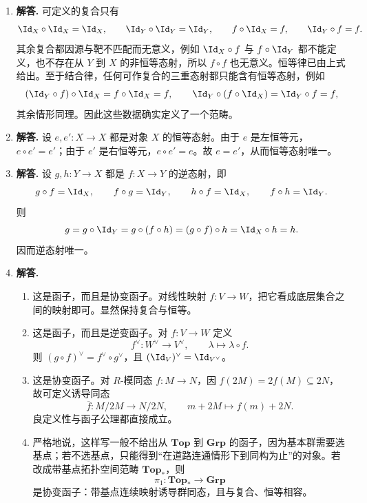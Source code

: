 \begin{enumerate}[label=\textbf{A.\arabic*.}, leftmargin=*, itemsep=1em]
  \item \textbf{解答.} 可定义的复合只有
  \[
    \Id_X\circ \Id_X=\Id_X,
    \qquad
    \Id_Y\circ \Id_Y=\Id_Y,
    \qquad
    f\circ \Id_X=f,
    \qquad
    \Id_Y\circ f=f.
  \]
  其余复合都因源与靶不匹配而无意义，例如 $\Id_X\circ f$ 与 $f\circ \Id_Y$ 都不能定义，也不存在从 $Y$ 到 $X$ 的非恒等态射，所以 $f\circ f$ 也无意义。恒等律已由上式给出。至于结合律，任何可作复合的三重态射都只能含有恒等态射，例如
  \[
    (\Id_Y\circ f)\circ \Id_X=f\circ \Id_X=f,
    \qquad
    \Id_Y\circ (f\circ \Id_X)=\Id_Y\circ f=f,
  \]
  其余情形同理。因此这些数据确实定义了一个范畴。

  \item \textbf{解答.} 设 $e,e'\colon X\to X$ 都是对象 $X$ 的恒等态射。由于 $e$ 是左恒等元，$e\circ e'=e'$；由于 $e'$ 是右恒等元，$e\circ e'=e$。故 $e=e'$，从而恒等态射唯一。

  \item \textbf{解答.} 设 $g,h\colon Y\to X$ 都是 $f\colon X\to Y$ 的逆态射，即
  \[
    g\circ f=\Id_X,
    \qquad f\circ g=\Id_Y,
    \qquad
    h\circ f=\Id_X,
    \qquad f\circ h=\Id_Y.
  \]
  则
  \[
    g=g\circ \Id_Y=g\circ (f\circ h)=(g\circ f)\circ h=\Id_X\circ h=h.
  \]
  因而逆态射唯一。

  \item \textbf{解答.}
  \begin{enumerate}[label=(\alph*), leftmargin=2.5em]
    \item 这是函子，而且是协变函子。对线性映射 $f\colon V\to W$，把它看成底层集合之间的映射即可。显然保持复合与恒等。
    \item 这是函子，而且是逆变函子。对 $f\colon V\to W$ 定义
    \[
      f^{\vee}\colon W^{\vee}\to V^{\vee},
      \qquad \lambda\mapsto \lambda\circ f.
    \]
    则 $(g\circ f)^{\vee}=f^{\vee}\circ g^{\vee}$，且 $(\Id_V)^{\vee}=\Id_{V^{\vee}}$。
    \item 这是协变函子。对 $R$-模同态 $f\colon M\to N$，因 $f(2M)=2f(M)\subseteq 2N$，故可定义诱导同态
    \[
      \overline f\colon M/2M\to N/2N,
      \qquad m+2M\mapsto f(m)+2N.
    \]
    良定义性与函子公理都直接成立。
    \item 严格地说，这样写一般不给出从 $\mathbf{Top}$ 到 $\mathbf{Grp}$ 的函子，因为基本群需要选基点；若不选基点，只能得到“在道路连通情形下到同构为止”的对象。若改成带基点拓扑空间范畴 $\mathbf{Top}_*$，则
    \[
      \pi_1\colon \mathbf{Top}_*\to \mathbf{Grp}
    \]
    是协变函子：带基点连续映射诱导群同态，且与复合、恒等相容。
  \end{enumerate}


\end{enumerate}
